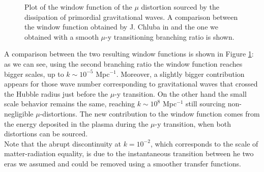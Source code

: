 \begin{figure}
    \centering
{}
\caption{Plot of the window function of the $\mu$ distortion sourced by the dissipation of primordial gravitational waves. A comparison between the window function obtained by J. Chluba in \cite{Chluba_tens_diss} and the one we obtained with a smooth $\mu$-y transitioning branching ratio is shown.}
\label{fig:mu_window}
\end{figure}
A comparison between the two resulting window functions is shown in Figure \ref{fig:mu_window}: as we can see, using the second branching ratio the window function reaches bigger scales, up to $k\sim10^{-5}$ Mpc$^{-1}$. Moreover, a slightly bigger contribution appears for those wave number corresponding to gravitational waves that crossed the Hubble radius just before the $\mu$-y transition. On the other hand the small scale behavior remains the same, reaching $k\sim10^{8}$ Mpc$^{-1}$ still sourcing non-negligible $\mu$-distortions. The new contribution to the window function comes from the energy deposited in the plasma during the $\mu$-y transition, when both distortions can be sourced.\\
Note that the abrupt discontinuity at $k=10^{-2}$, which corresponds to the scale of matter-radiation equality, is due to the instantaneous transition between he two eras we assumed and could be removed using a smoother transfer functions.

